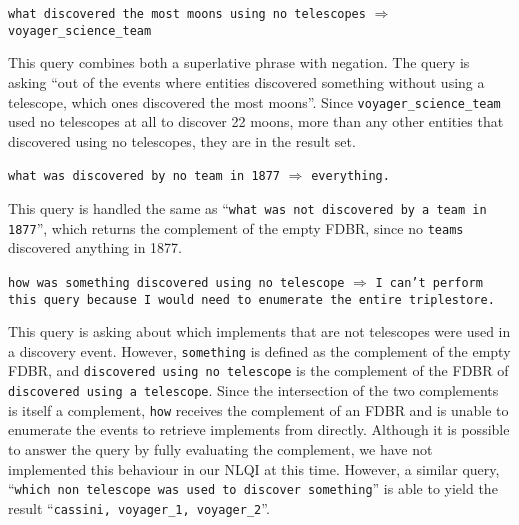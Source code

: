 \documentclass[../main.tex]{subfiles}
\begin{document}
\begin{refsection}
\examplespacing

\texttt{what discovered the most moons using no telescopes} \linebreak \indent \indent $\Rightarrow$ \texttt{voyager\_science\_team}

\examplespacing

\noindent This query combines both a superlative phrase with negation.  The query is asking ``out of the events where entities discovered something without using a telescope, which ones discovered the most moons''.  Since \texttt{voyager\_science\_team} used no telescopes at all to discover 22 moons, more than any other entities that discovered using no telescopes, they are in the result set.

\examplespacing

\texttt{what was discovered by no team in 1877} $\Rightarrow$ \texttt{everything.}

\examplespacing

\noindent This query is handled the same as ``\texttt{what was not discovered by a team in 1877}'', which returns the complement of the empty FDBR, since no \texttt{teams} discovered anything in 1877.

\examplespacing

\texttt{how was something discovered using no telescope} $\Rightarrow$ \texttt{I can't perform this query because I would need to enumerate the entire triplestore.}

\examplespacing

\noindent This query is asking about which implements that are not telescopes were used in a discovery event.  However, \texttt{something} is defined as the complement of the empty FDBR, and \texttt{discovered using no telescope} is the complement of the FDBR of \texttt{discovered using a telescope}.  Since the intersection of the two complements is itself a complement, \texttt{how} receives the complement of an FDBR and is unable to enumerate the events to retrieve implements from directly.  Although it is possible to answer the query by fully evaluating the complement, we have not implemented this behaviour in our NLQI at this time.  However, a similar query, ``\texttt{which non telescope was used to discover something}'' is able to yield the result ``\texttt{cassini, voyager\_1, voyager\_2}''.




\end{refsection}
\end{document}

